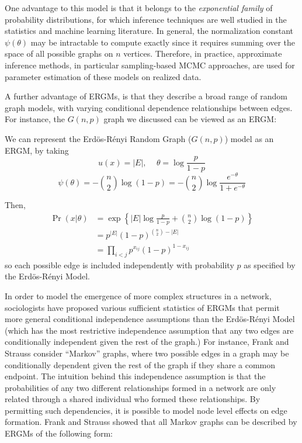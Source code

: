  One advantage to this model is that it belongs to the  \emph{exponential family} of probability distributions, for which inference techniques are well studied in the statistics and machine learning literature. In general, the normalization constant $\psi(\theta)$ may be intractable to compute exactly since it requires summing over the space of all possible graphs on $n$ vertices. Therefore, in practice, approximate inference methods, in particular sampling-based MCMC approaches, are used for parameter estimation of these models on realized data. 
 
 A further advantage of ERGMs, is that they describe a broad range of random graph models, with varying conditional dependence relationships between edges.  For instance, the $G(n,p)$ graph we discussed can be viewed as an ERGM:
 
 \begin{example}[$G(n,p)$ graphs]
 	\label{ex:ER_model}
 We can represent the Erd\"{o}s-R\'{e}nyi Random Graph ($G(n,p)$) model as an ERGM, by taking 
 $$u(x) = |E| \text{, } \quad
 \theta = \log \frac{p}{1-p}$$ %
  $$\psi(\theta)  = -\binom{n}{2} \log(1-p) = -\binom{n}{2} \log \frac{e^{-\theta}}{1+ e^{-\theta}}
  $$
  
  Then, 
  \begin{align*}
    \Pr(x|\theta) & = \exp\left\{ |E| \log \frac{p}{1-p} + \binom{n}{2} \log(1-p)  \right\}  \\
    & = p^{|E|} (1-p)^{\binom{n}{2} - |E|}\\
    & = \prod_{i < j} p^{x_{ij}} (1-p)^{1 - x_{ij}}
  \end{align*}
  so each possible edge is included independently with probability $p$ as specified by the Erd\"{o}s-R\'{e}nyi Model.
 \end{example}

In order to model the emergence of more complex structures in a network, sociologists have proposed various sufficient statistics of ERGMs that permit more general conditional independence assumptions than the Erd\"{o}s-R\'{e}nyi Model (which has the most restrictive independence assumption that any two edges are conditionally independent given the rest of the graph.) For instance, Frank and Strauss \cite{FS86} consider ``Markov'' graphs, where two possible edges in a graph may be conditionally dependent given the rest of the graph if they share a common endpoint. The intuition behind this independence assumption is that the probabilities of any two different relationships formed in a network are only related through a shared individual who formed these relationships. By permitting such dependencies, it is possible to model node level effects on edge formation. Frank and Strauss showed that all Markov graphs can be described by ERGMs of the following form:

